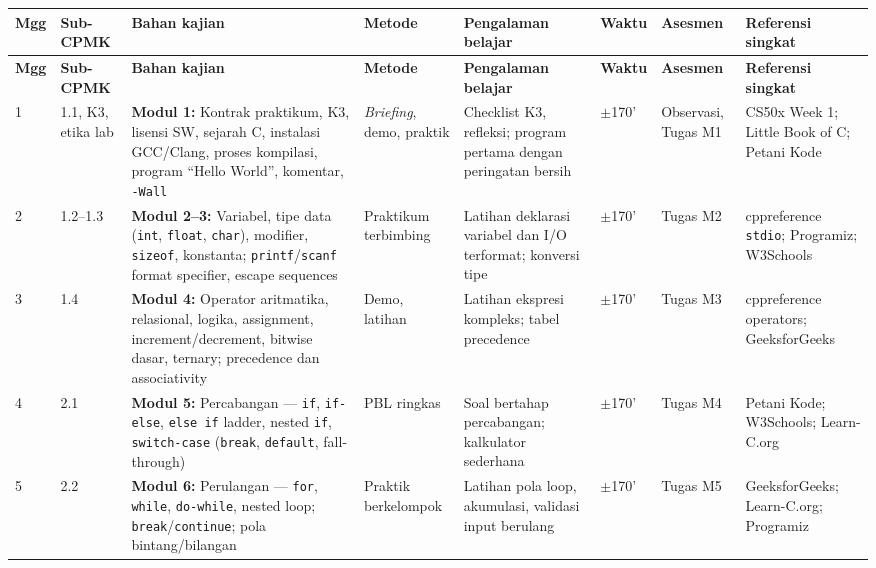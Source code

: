 \documentclass[12pt,a4paper]{article}
\begin{document}
{\small
\begin{landscape}
\setlength{\tabcolsep}{3pt}
\renewcommand{\arraystretch}{1.15}
\begin{longtable}{|p{0.55cm}|p{2.35cm}|p{2.8cm}|p{1.65cm}|p{2.55cm}|p{1.0cm}|p{1.65cm}|p{3.0cm}|}
\hline
\textbf{Mgg} & \textbf{Sub-CPMK} & \textbf{Bahan kajian} & \textbf{Metode} & \textbf{Pengalaman belajar} & \textbf{Waktu} & \textbf{Asesmen} & \textbf{Referensi singkat} \\
\hline
\endfirsthead
\hline
\textbf{Mgg} & \textbf{Sub-CPMK} & \textbf{Bahan kajian} & \textbf{Metode} & \textbf{Pengalaman belajar} & \textbf{Waktu} & \textbf{Asesmen} & \textbf{Referensi singkat} \\
\hline
\endhead
\hline
\endfoot

1 & 1.1, K3, etika lab & \textbf{Modul 1:} Kontrak praktikum, K3, lisensi SW, sejarah C, instalasi GCC/Clang, proses kompilasi, program ``Hello World'', komentar, \texttt{-Wall} & \textit{Briefing}, demo, praktik & Checklist K3, refleksi; program pertama dengan peringatan bersih & $\pm$170' & Observasi, Tugas M1 & CS50x Week 1; Little Book of C; Petani Kode \\
\hline
2 & 1.2--1.3 & \textbf{Modul 2--3:} Variabel, tipe data (\texttt{int}, \texttt{float}, \texttt{char}), modifier, \texttt{sizeof}, konstanta; \texttt{printf}/\texttt{scanf} format specifier, escape sequences & Praktikum terbimbing & Latihan deklarasi variabel dan I/O terformat; konversi tipe & $\pm$170' & Tugas M2 & cppreference \texttt{stdio}; Programiz; W3Schools \\
\hline
3 & 1.4 & \textbf{Modul 4:} Operator aritmatika, relasional, logika, assignment, increment/decrement, bitwise dasar, ternary; precedence dan associativity & Demo, latihan & Latihan ekspresi kompleks; tabel precedence & $\pm$170' & Tugas M3 & cppreference operators; GeeksforGeeks \\
\hline
4 & 2.1 & \textbf{Modul 5:} Percabangan --- \texttt{if}, \texttt{if-else}, \texttt{else if} ladder, nested \texttt{if}, \texttt{switch-case} (\texttt{break}, \texttt{default}, fall-through) & PBL ringkas & Soal bertahap percabangan; kalkulator sederhana & $\pm$170' & Tugas M4 & Petani Kode; W3Schools; Learn-C.org \\
\hline
5 & 2.2 & \textbf{Modul 6:} Perulangan --- \texttt{for}, \texttt{while}, \texttt{do-while}, nested loop; \texttt{break}/\texttt{continue}; pola bintang/bilangan & Praktik berkelompok & Latihan pola loop, akumulasi, validasi input berulang & $\pm$170' & Tugas M5 & GeeksforGeeks; Learn-C.org; Programiz \\

\end{longtable}
\end{landscape}}
\end{document}
